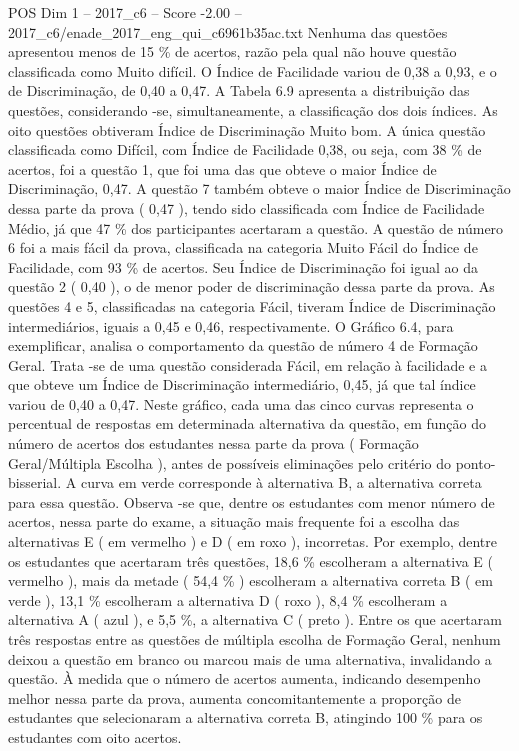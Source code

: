 \begin{textsample}{POS Dim 1 – 2017\_c6 – Score -2.00 – 2017\_c6/enade\_2017\_eng\_qui\_c6961b35ac.txt}
Nenhuma das questões apresentou menos de 15 \% de acertos, razão pela qual não houve questão classificada como Muito difícil.
O Índice de Facilidade variou de 0,38 a 0,93, e o de Discriminação, de 0,40 a 0,47.
A Tabela 6.9 apresenta a distribuição das questões, considerando -se, simultaneamente, a classificação dos dois índices.
As oito questões obtiveram Índice de Discriminação Muito bom.
A única questão classificada como Difícil, com Índice de Facilidade 0,38, ou seja, com 38 \% de acertos, foi a questão 1, que foi uma das que obteve o maior Índice de Discriminação, 0,47.
A questão 7 também obteve o maior Índice de Discriminação dessa parte da prova ( 0,47 ), tendo sido classificada com Índice de Facilidade Médio, já que 47 \% dos participantes acertaram a questão.
A questão de número 6 foi a mais fácil da prova, classificada na categoria Muito Fácil do Índice de Facilidade, com 93 \% de acertos.
Seu Índice de Discriminação foi igual ao da questão 2 ( 0,40 ), o de menor poder de discriminação dessa parte da prova.
As questões 4 e 5, classificadas na categoria Fácil, tiveram Índice de Discriminação intermediários, iguais a 0,45 e 0,46, respectivamente.
O Gráfico 6.4, para exemplificar, analisa o comportamento da questão de número 4 de Formação Geral.
Trata -se de uma questão considerada Fácil, em relação à facilidade e a que obteve um Índice de Discriminação intermediário, 0,45, já que tal índice variou de 0,40 a 0,47.
Neste gráfico, cada uma das cinco curvas representa o percentual de respostas em determinada alternativa da questão, em função do número de acertos dos estudantes nessa parte da prova ( Formação Geral/Múltipla Escolha ), antes de possíveis eliminações pelo critério do ponto-bisserial.
A curva em verde corresponde à alternativa B, a alternativa correta para essa questão.
Observa -se que, dentre os estudantes com menor número de acertos, nessa parte do exame, a situação mais frequente foi a escolha das alternativas E ( em vermelho ) e D ( em roxo ), incorretas.
Por exemplo, dentre os estudantes que acertaram três questões, 18,6 \% escolheram a alternativa E ( vermelho ), mais da metade ( 54,4 \% ) escolheram a alternativa correta B ( em verde ), 13,1 \% escolheram a alternativa D ( roxo ), 8,4 \% escolheram a alternativa A ( azul ), e 5,5 \%, a alternativa C ( preto ).
Entre os que acertaram três respostas entre as questões de múltipla escolha de Formação Geral, nenhum deixou a questão em branco ou marcou mais de uma alternativa, invalidando a questão.
À medida que o número de acertos aumenta, indicando desempenho melhor nessa parte da prova, aumenta concomitantemente a proporção de estudantes que selecionaram a alternativa correta B, atingindo 100 \% para os estudantes com oito acertos.

\end{textsample}
